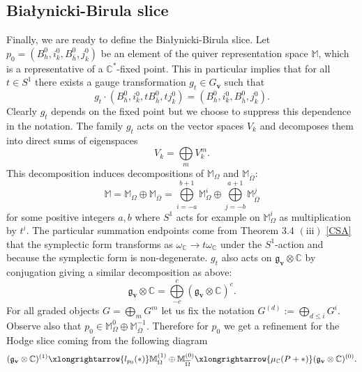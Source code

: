 \documentclass[12pt,oneside,reqno]{amsart}
\theoremstyle{definition}
\numberwithin{equation}{section}
\numberwithin{theorem}{section}
\newcommand{\C}{\mathbb{C}}
\begin{document}
\subsection{Bia\l{}ynicki-Birula slice}
Finally, we are ready to define the Bia\l{}ynicki-Birula slice. Let $p_0=(B_h^0,i_k^0,B_{\bar h}^0,j_k^0)$ be an element of the quiver representation space $\mathbb M$, which is a representative of a $\C^*$-fixed point. This in particular implies that for all $t\in S^1$ there exists a gauge transformation $g_t\in G_{\mathbf{v}}$ such that 
%
\begin{equation}
g_t\cdot (B_h^0,i_k^0,tB_{\bar h}^0,tj_k^0) = (B_h^0,i_k^0,B_{\bar h}^0,j_k^0).
\end{equation}
%
Clearly $g_t$ depends on the fixed point but we choose to suppress this dependence in the notation. The family $g_t$ acts on the vector spaces $V_k$ and decomposes them into direct sums of eigenspaces
%
\begin{equation}
V_k = \bigoplus\limits_{m} V_k^m.
\end{equation}
%
This decomposition induces decompositions of $\mathbb{M}_{\Omega}$ and $\mathbb M_{\overline{\Omega}}$:
%
\begin{equation*}
    \mathbb{M}=\mathbb{M}_{\Omega}\oplus \mathbb{M}_{\overline{\Omega}} = \bigoplus\limits_{i=-a}^{b+1}\mathbb{M}_{\Omega}^i\oplus\bigoplus\limits_{j = -b}^{a+1}\mathbb{M}_{\overline{\Omega}}^j
\end{equation*}
%
for some positive integers $a,b$ where $S^1$ acts for example on $\mathbb{M}_{\Omega}^i$ as multiplication by $t^i$. The particular summation endpoints come from Theorem $3.4$ $(\text{iii})$ \ref{CSA} that the symplectic form transforms as  $\omega_{\C}\to t\omega_{\C}$ under the $S^1$-action and because the symplectic form is non-degenerate. $g_t$ also acts on $\mathfrak g_{\mathbf{v}}\otimes\C$ by conjugation giving a similar decomposition as above:
%
\begin{equation*}
\mathfrak g_{\mathbf{v}}\otimes\C = \bigoplus\limits_{-c}^c (\mathfrak g_{\mathbf{v}}\otimes\C)^c.
\end{equation*}
%
For all graded objects $G = \bigoplus\limits_{m} G^m$ let us fix the notation $ G^{(d)} := \bigoplus\limits_{d\le i} G^i$. Observe also that $p_0 \in \mathbb M_{\Omega}^0\oplus \mathbb M_{\overline{\Omega}}^{-1}$. Therefore for $p_0$ we get a refinement for the Hodge slice coming from the following diagram
%
\begin{equation}
(\mathfrak g_{\mathbf{v}}\otimes\C)^{(1)}\xlongrightarrow{l_{p_0}(*)}  \mathbb M_{\Omega}^{(1)}\oplus \mathbb M_{\overline{\Omega}}^{(0)}\xlongrightarrow{\mu_{\C}(P+*)}(\mathfrak g_{\mathbf{v}}\otimes\C)^{(0)}.
\end{equation}
%
\end{document}
